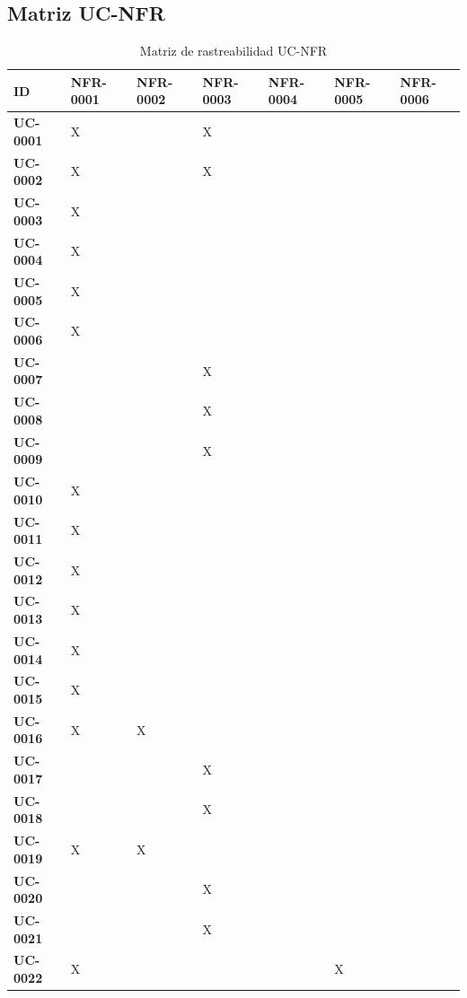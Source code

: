 \documentclass[11pt, a4paper]{article}
\begin{document}
\subsection{Matriz UC-NFR}

\begin{center}
{\small
\begin{longtable}{|p{2.2cm}|p{2.0cm}|p{2.0cm}|p{2.0cm}|p{2.0cm}|p{2.0cm}|p{2.0cm}|}
\caption{Matriz de rastreabilidad UC-NFR} \label{tab:matriz-uc-nfr} \\
\hline
\textbf{ID} & \textbf{NFR-0001} & \textbf{NFR-0002} & \textbf{NFR-0003} & \textbf{NFR-0004} & \textbf{NFR-0005} & \textbf{NFR-0006} \\
\hline
\hline
\endhead
\textbf{UC-0001} & X &  & X &  &  &  \\
\hline
\textbf{UC-0002} & X &  & X &  &  &  \\
\hline
\textbf{UC-0003} & X &  &  &  &  &  \\
\hline
\textbf{UC-0004} & X &  &  &  &  &  \\
\hline
\textbf{UC-0005} & X &  &  &  &  &  \\
\hline
\textbf{UC-0006} & X &  &  &  &  &  \\
\hline
\textbf{UC-0007} &  &  & X &  &  &  \\
\hline
\textbf{UC-0008} &  &  & X &  &  &  \\
\hline
\textbf{UC-0009} &  &  & X &  &  &  \\
\hline
\textbf{UC-0010} & X &  &  &  &  &  \\
\hline
\textbf{UC-0011} & X &  &  &  &  &  \\
\hline
\textbf{UC-0012} & X &  &  &  &  &  \\
\hline
\textbf{UC-0013} & X &  &  &  &  &  \\
\hline
\textbf{UC-0014} & X &  &  &  &  &  \\
\hline
\textbf{UC-0015} & X &  &  &  &  &  \\
\hline
\textbf{UC-0016} & X & X &  &  &  &  \\
\hline
\textbf{UC-0017} &  &  & X &  &  &  \\
\hline
\textbf{UC-0018} &  &  & X &  &  &  \\
\hline
\textbf{UC-0019} & X & X &  &  &  &  \\
\hline
\textbf{UC-0020} &  &  & X &  &  &  \\
\hline
\textbf{UC-0021} &  &  & X &  &  &  \\
\hline
\textbf{UC-0022} & X &  &  &  & X &  \\

\end{longtable}}
\end{center}
\end{document}
